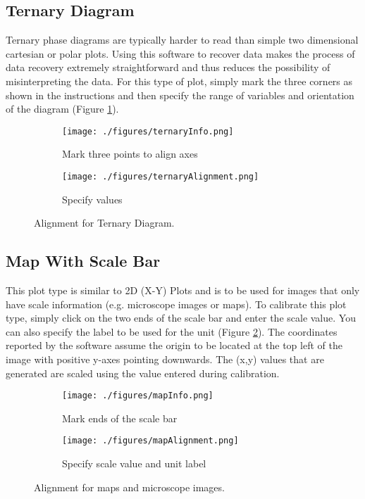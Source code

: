 \documentclass[letterpaper, 10pt]{article}
\begin{document}
\subsection{Ternary Diagram}
Ternary phase diagrams are typically harder to read than simple two dimensional cartesian or polar plots. Using this software to recover data makes the process of data recovery extremely straightforward and thus reduces the possibility of misinterpreting the data. For this type of plot, simply mark the three corners as shown in the instructions and then specify the range of variables and orientation of the diagram (Figure \ref{fig:ternaryAlignment}).

\begin{figure}
\centering
{\begin{subfigure}[b]{0.4\textwidth}
\texttt{[image: ./figures/ternaryInfo.png]}
\caption{Mark three points to align axes}
\end{subfigure}
\begin{subfigure}[b]{0.4\textwidth}
\texttt{[image: ./figures/ternaryAlignment.png]}
\caption{Specify values}
\end{subfigure}}
\caption{Alignment for Ternary Diagram.}
\label{fig:ternaryAlignment}
\end{figure}

\subsection{Map With Scale Bar}
This plot type is similar to 2D (X-Y) Plots and is to be used for images that only have scale information (e.g. microscope images or maps). To calibrate this plot type, simply click on the two ends of the scale bar and enter the scale value. You can also specify the label to be used for the unit (Figure \ref{fig:mapAlignment}). The coordinates reported by the software assume the origin to be located at the top left of the image with positive y-axes pointing downwards. The (x,y) values that are generated are scaled using the value entered during calibration.

\begin{figure}
\centering
{\begin{subfigure}[b]{0.3\textwidth}
\texttt{[image: ./figures/mapInfo.png]}
\caption{Mark ends of the scale bar}
\end{subfigure}
\begin{subfigure}[b]{0.3\textwidth}
\texttt{[image: ./figures/mapAlignment.png]}
\caption{Specify scale value and unit label}
\end{subfigure}}
\caption{Alignment for maps and microscope images.}
\label{fig:mapAlignment}
\end{figure}
\end{document}
